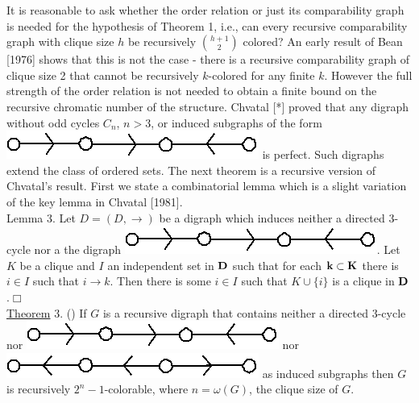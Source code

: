 \documentclass[twoside]{article}
\begin{document}
It is reasonable to ask whether the order relation or just its comparability graph is needed for the hypothesis of
Theorem 1, i.e., can every recursive comparability graph with clique size $h$ be recursively $\binom{h+1}{2}$ colored?   An early result of Bean [1976] shows that
this is not the case - there is a recursive comparability graph of clique size
2	that cannot be recursively   $k$-colored for any finite $k$.    However the full strength of the order relation is not needed to obtain a finite bound on the recursive chromatic number of the structure.    
Chvatal [*] proved that any digraph without odd cycles  $C_n$,  $n>3$, or induced subgraphs of the form \includegraphics[scale=0.25]{figures/small/1.png} is perfect.   
Such digraphs extend the class of ordered sets. 
The next theorem is a recursive version of Chvatal's result.   
First we state a combinatorial lemma which is a slight variation of the key lemma in Chvatal [1981].\\
\newline
Lemma 3.    Let   $D = (D, \rightarrow)$ be a digraph which induces neither a directed 3-cycle nor a the digraph \includegraphics[scale=0.25]{figures/small/1.png}.    
Let   $K$   be a clique and $I$ an independent set in   $\mathbf{D}$   such that for each   $\mathbf{k\subset K}$   there is  $i\in I$   such that $i\rightarrow k$. 
Then there is some $i\in I$   such that   $K\cup \{i\}$ is a clique in $\mathbf{D}$.$\Box$\\
\newline
\underline{Theorem} 3. (\cite{Kierstead84}) If   $G$   is a recursive digraph that contains neither a directed 3-cycle nor \includegraphics[scale=0.25]{figures/small/1.png} nor \includegraphics[scale=0.25]{figures/small/2.png} as induced
\newpage
%
%
\noindent subgraphs then $G$ is recursively $2^n-1$-colorable, where $n = \omega(G)$, the clique size of $G$.\\
\end{document}
